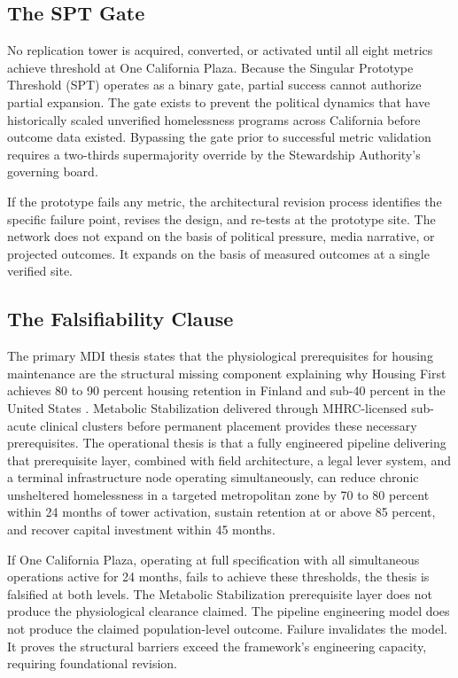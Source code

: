 \documentclass[12pt, letterpaper]{article}
\begin{document}
\subsection{The SPT Gate}

No replication tower is acquired, converted, or activated until all eight metrics achieve threshold at One California Plaza. Because the Singular Prototype Threshold (SPT) operates as a binary gate, partial success cannot authorize partial expansion. The gate exists to prevent the political dynamics that have historically scaled unverified homelessness programs across California before outcome data existed. Bypassing the gate prior to successful metric validation requires a two-thirds supermajority override by the Stewardship Authority's governing board.

If the prototype fails any metric, the architectural revision process identifies the specific failure point, revises the design, and re-tests at the prototype site. The network does not expand on the basis of political pressure, media narrative, or projected outcomes. It expands on the basis of measured outcomes at a single verified site.

\subsection{The Falsifiability Clause}

The primary MDI thesis states that the physiological prerequisites for housing maintenance are the structural missing component explaining why Housing First achieves 80 to 90 percent housing retention in Finland and sub-40 percent in the United States \citep{ucsf_bhhi_2023}. Metabolic Stabilization delivered through MHRC-licensed sub-acute clinical clusters before permanent placement provides these necessary prerequisites. The operational thesis is that a fully engineered pipeline delivering that prerequisite layer, combined with field architecture, a legal lever system, and a terminal infrastructure node operating simultaneously, can reduce chronic unsheltered homelessness in a targeted metropolitan zone by 70 to 80 percent within 24 months of tower activation, sustain retention at or above 85 percent, and recover capital investment within 45 months.

If One California Plaza, operating at full specification with all simultaneous operations active for 24 months, fails to achieve these thresholds, the thesis is falsified at both levels. The Metabolic Stabilization prerequisite layer does not produce the physiological clearance claimed. The pipeline engineering model does not produce the claimed population-level outcome. Failure invalidates the model. It proves the structural barriers exceed the framework's engineering capacity, requiring foundational revision.
\end{document}

